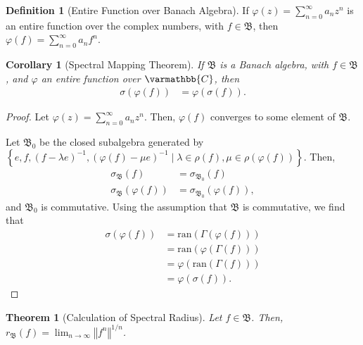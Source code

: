 \documentclass[10pt]{extarticle}
\newcommand{\C}{\mathbb{C}}
\newcommand{\norm}[1]{\left\Vert #1\right\Vert}
\newcommand{\set}[1]{\left\{#1\right\}}
\theoremstyle{plain}
\newtheorem*{theorem}{Theorem}
\newtheorem*{corollary}{Corollary}
\theoremstyle{definition}
\newtheorem*{definition}{Definition}
\theoremstyle{note}
\renewcommand*{\mathbb}[1]{\varmathbb{#1}}
\renewcommand{\newline}{\hfill\break}
\begin{document}
\begin{definition}[Entire Function over Banach Algebra]
  If $\varphi(z) = \sum_{n=0}^{\infty}a_nz^{n}$ is an entire function over the complex numbers, with $f\in \mathfrak{B}$, then $\varphi(f) = \sum_{n=0}^{\infty}a_nf^{n}$.
\end{definition}
\begin{corollary}[Spectral Mapping Theorem]
If $\mathfrak{B}$ is a Banach algebra, with $f\in \mathfrak{B}$, and $\varphi$ an entire function over $\C$, then
\begin{align*}
  \sigma\left(\varphi(f)\right) &= \varphi\left(\sigma(f)\right).
\end{align*}
\end{corollary}
\begin{proof}
  Let $\varphi(z) = \sum_{n=0}^{\infty}a_nz^{n}$. Then, $\varphi(f)$ converges to some element of $\mathfrak{B}$.\newline

  Let $\mathfrak{B}_0$ be the closed subalgebra generated by $\set{e,f,\left(f-\lambda e\right)^{-1},\left(\varphi(f)-\mu e\right)^{-1}\mid \lambda\in \rho(f),\mu\in\rho\left(\varphi(f)\right)}$. Then,
  \begin{align*}
    \sigma_{\mathfrak{B}}(f) &= \sigma_{\mathfrak{B}_0}\left(f\right)\\
    \sigma_{\mathfrak{B}}\left(\varphi(f)\right) &= \sigma_{\mathfrak{B}_0}\left(\varphi(f)\right),
  \end{align*}
  and $\mathfrak{B}_0$ is commutative. Using the assumption that $\mathfrak{B}$ is commutative, we find that 
  \begin{align*}
    \sigma\left(\varphi(f)\right) &= \text{ran}\left(\Gamma\left(\varphi(f)\right)\right)\\
                                  &= \text{ran}\left(\varphi\left(\Gamma(f)\right)\right)\\
                                  &= \varphi\left(\text{ran}\left(\Gamma(f)\right)\right)\\
                                  &= \varphi\left(\sigma(f)\right).
  \end{align*}
\end{proof}
\begin{theorem}[Calculation of Spectral Radius]
  Let $f\in \mathfrak{B}$. Then, $r_{\mathfrak{B}}(f) = \lim_{n\rightarrow\infty}\norm{f^n}^{1/n}$.
\end{theorem}
\end{document}
